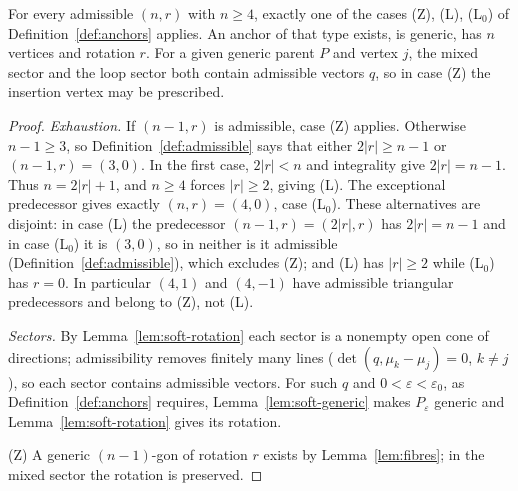 \begin{proposition}\label{prop:anchors-exist}\leanok
For every admissible $(n,r)$ with $n\geq4$, exactly one of the cases
(Z), (L), (L$_0$) of Definition~\ref{def:anchors} applies. An anchor
of that type exists, is generic, has $n$ vertices and rotation $r$. For a given generic parent $P$ and vertex $j$, the mixed
sector and the loop sector both contain admissible vectors $q$, so in case
(Z) the insertion vertex may be prescribed. 
\end{proposition}
\begin{proof}\leanok{}
\emph{Exhaustion.} If $(n-1,r)$ is admissible, case (Z) applies.
Otherwise $n-1\geq3$, so Definition~\ref{def:admissible} says that
either $2|r|\geq n-1$ or $(n-1,r)=(3,0)$. In the first case,
$2|r|<n$ and integrality give $2|r|=n-1$. Thus
$n=2|r|+1$, and $n\geq4$ forces $|r|\geq2$, giving (L).
The exceptional predecessor gives exactly $(n,r)=(4,0)$, case
(L$_0$). These alternatives are disjoint: in case (L) the predecessor
$(n-1,r)=(2|r|,r)$ has $2|r|=n-1$ and in case (L$_0$) it is $(3,0)$, so in
neither is it admissible (Definition~\ref{def:admissible}), which excludes
(Z); and (L) has $|r|\geq2$ while (L$_0$) has $r=0$. In particular $(4,1)$
and $(4,-1)$ have admissible triangular predecessors and belong
 to (Z), not (L).

\emph{Sectors.} By Lemma~\ref{lem:soft-rotation} each sector is a nonempty
open cone of directions; admissibility removes finitely many lines
($\det(q,\mu_k-\mu_j)=0$, $k\neq j$), so each sector contains admissible
vectors. For such $q$ and $0<\varepsilon<\varepsilon_0$, as Definition~\ref{def:anchors}
requires, Lemma~\ref{lem:soft-generic} makes $P_\varepsilon$ generic and
Lemma~\ref{lem:soft-rotation} gives its rotation.

(Z) A generic $(n-1)$-gon of rotation $r$ exists by Lemma~\ref{lem:fibres};
in the mixed sector the rotation is preserved.


\end{proof}
